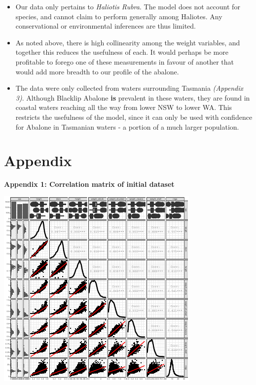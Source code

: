 \documentclass[letterpaper,9pt,twocolumn,twoside,]{pinp}
\providecommand{\tightlist}{%
  \setlength{\itemsep}{0pt}\setlength{\parskip}{0pt}}
\begin{document}
\begin{itemize}
\tightlist
\item
  Our data only pertains to \emph{Haliotis Rubra}. The model does not
  account for species, and cannot claim to perform generally among
  Haliotes. Any conservational or environmental inferences are thus
  limited.
\item
  As noted above, there is high collinearity among the weight variables,
  and together this reduces the usefulness of each. It would perhaps be
  more profitable to forego one of these measurements in favour of
  another that would add more breadth to our profile of the abalone.
\item
  The data were only collected from waters surrounding Tasmania
  \emph{(Appendix 3)}. Although Blacklip Abalone \textbf{is} prevalent
  in these waters, they are found in coastal waters reaching all the way
  from lower NSW to lower WA. This restricts the usefulness of the
  model, since it can only be used with confidence for Abalone in
  Tasmanian waters - a portion of a much larger population.
\end{itemize}

\hypertarget{appendix}{%
\section{Appendix}\label{appendix}}

\textbf{Appendix 1: Correlation matrix of initial dataset}

\begin{center}\includegraphics{ExecSum_files/figure-latex/unnamed-chunk-10-1} \end{center}
\end{document}
